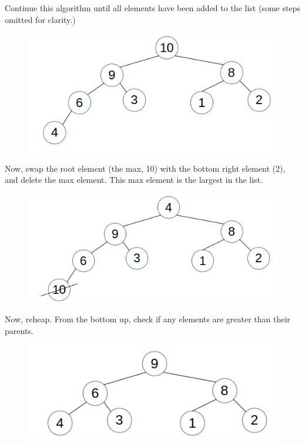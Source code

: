\documentclass{article}
\begin{document}
Continue this algorithm until all elements have been added to the list (some steps omitted for clarity.)

\begin{figure}[H]
\includegraphics[scale=0.5]{./P16/0full}
\centering
\end{figure}

Now, swap the root element (the max, 10) with the bottom right element (2), and delete the max element. This max element is the largest in the list. 

\begin{figure}[H]
\includegraphics[scale=0.5]{./P16/r10}
\centering
\end{figure}


Now, reheap. From the bottom up, check if any elements are greater than their parents. 


\begin{figure}[H]
\includegraphics[scale=0.5]{./P16/m9}
\centering
\end{figure}
\end{document}
